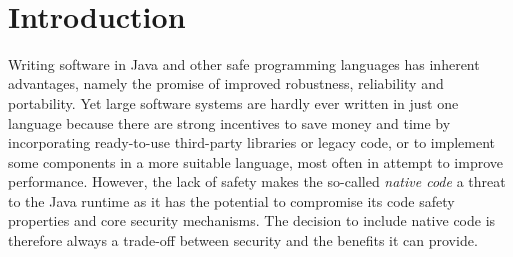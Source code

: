 \documentclass[a4paper,12pt,twoside,openright]{report}
\begin{document}

\pagestyle{empty}
\singlespacing

\onehalfspacing

\singlespacing


\setcounter{page}{0}
\pagestyle{plain}
\tableofcontents

\onehalfspacing
\newpage ~ \cleardoublepage %

\setcounter{page}{1} 

\chapter{Introduction}

Writing software in Java and other safe programming languages has inherent advantages, namely the promise of improved robustness, reliability and portability. Yet large software systems are hardly ever written in just one language because there are strong incentives to save money and time by incorporating ready-to-use third-party libraries or legacy code, or to implement some components in a more suitable language, most often in attempt to improve performance. However, the lack of safety makes the so-called \emph{native code} a threat to the Java runtime as it has the potential to compromise its code safety properties and core security mechanisms. The decision to include native code is therefore always a trade-off between security and the benefits it can provide.
\end{document}
